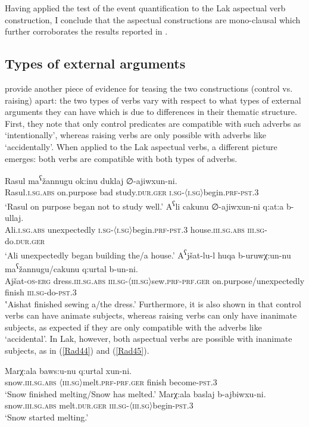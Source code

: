 \documentclass[output=paper]{langscibook}
\begin{document}
Having applied the test of the event quantification to the Lak aspectual verb construction, I conclude that the aspectual constructions are mono-clausal which further corroborates the results reported in .

\subsection{Types of external arguments}
\citet{PolinskyPotsdam2002}  provide another piece of evidence for teasing the two constructions (control vs. raising) apart: the two types of verbs vary with respect to what types of external arguments they can have which is due to differences in their thematic structure. First, they note that only control predicates are compatible with such adverbs as ‘intentionally’, whereas raising verbs are only possible with adverbs like ‘accidentally’. When applied to the Lak aspectual verbs, a different picture emerges: both verbs are compatible with both types of adverbs.

\ea\label{Rad41}
\gll Rasul ma\textsuperscript{ʕ}žannugu ok:inu duklaj	∅-ajiwxun-ni.\\
Rasul.\textsc{i.sg.abs} on.purpose bad study.\textsc{dur.ger} \textsc{i.sg-〈i.sg〉}begin.\textsc{prf-pst.3}\\
\glt ‘Rasul on purpose began not to study well.’
\ex\label{Rad42}
\gll A\textsuperscript{ʕ}li cakunu ∅-ajiwxun-ni q:at:a b-ullaj.\\
Ali.\textsc{i.sg.abs} unexpectedly \textsc{i.sg-〈i.sg〉}begin.\textsc{prf-pst.3} house.\textsc{iii.sg.abs} \textsc{iii.sg}-do.\textsc{dur.ger}\\
\glt ‘Ali unexpectedly began building the/a house.’
\ex\label{Rad43}
\gll A\textsuperscript{ʕ}jšat-lu-l huqa b-uruwχ:un-nu ma\textsuperscript{ʕ}žannugu/cakunu q:urtal b-un-ni.\\
Ajšat-\textsc{os-erg} 	dress.\textsc{iii.sg.abs} \textsc{iii.sg-〈iii.sg〉}sew.\textsc{prf-prf.ger} on.purpose/unexpectedly	finish 	\textsc{iii.sg}-do-\textsc{pst.3}\\	
\glt ‛Aishat finished sewing a/the dress.’
\z 
Furthermore, it is also shown in \citet{PolinskyPotsdam2002} that control verbs can have animate subjects, whereas raising verbs can only have inanimate subjects, as expected if they are only compatible with the adverbs like ‘accidental’. In Lak, however, both aspectual verbs are possible with inanimate subjects, as in (\ref{Rad44}) and (\ref{Rad45}).   

\ea\label{Rad44}
\gll Marχ:ala baws:u-nu q:urtal xun-ni.\\
snow.\textsc{iii.sg.abs} \textsc{〈iii.sg〉}melt.\textsc{prf-prf.ger} finish become-\textsc{pst.3}\\
\glt ‘Snow finished melting/Snow has melted.’
\ex\label{Rad45}
\gll Marχ:ala baslaj b-ajbiwxu-ni.\\
snow.\textsc{iii.sg.abs} melt.\textsc{dur.ger} \textsc{iii.sg-〈iii.sg〉}begin-\textsc{pst.3}\\
\glt ‘Snow started melting.’
\z 
\end{document}
